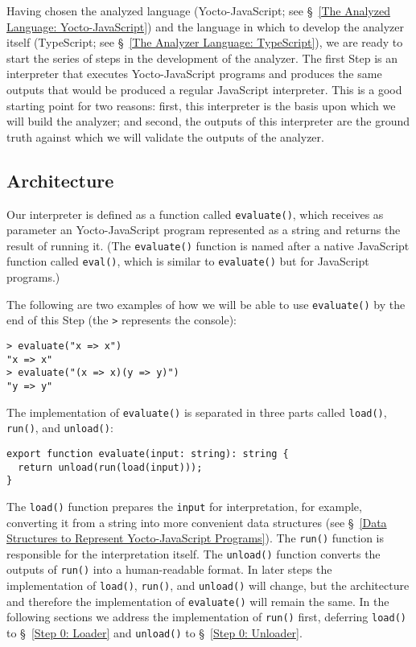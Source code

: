 \documentclass[12pt, oneside]{book}
\begin{document}
Having chosen the analyzed language (Yocto-JavaScript; see §~\ref{The Analyzed Language: Yocto-JavaScript}) and the language in which to develop the analyzer itself (TypeScript; see §~\ref{The Analyzer Language: TypeScript}), we are ready to start the series of steps in the development of the analyzer. The first Step is an interpreter that executes Yocto-JavaScript programs and produces the same outputs that would be produced a regular JavaScript interpreter. This is a good starting point for two reasons: first, this interpreter is the basis upon which we will build the analyzer; and second, the outputs of this interpreter are the ground truth against which we will validate the outputs of the analyzer.

\subsection{Architecture}
\label{Architecture}

Our interpreter is defined as a function called \texttt{evaluate()}, which receives as parameter an Yocto-JavaScript program represented as a string and returns the result of running it. (The \texttt{evaluate()} function is named after a native JavaScript function called \texttt{eval()}, which is similar to \texttt{evaluate()} but for JavaScript programs.)

The following are two examples of how we will be able to use \texttt{evaluate()} by the end of this Step (the \texttt{>} represents the console):

\begin{verbatim}
> evaluate("x => x")
"x => x"
> evaluate("(x => x)(y => y)")
"y => y"
\end{verbatim}

The implementation of \texttt{evaluate()} is separated in three parts called \texttt{load()}, \texttt{run()}, and \texttt{unload()}:

\begin{verbatim}
export function evaluate(input: string): string {
  return unload(run(load(input)));
}
\end{verbatim}

The \texttt{load()} function prepares the \texttt{input} for interpretation, for example, converting it from a string into more convenient data structures (see §~\ref{Data Structures to Represent Yocto-JavaScript Programs}). The \texttt{run()} function is responsible for the interpretation itself. The \texttt{unload()} function converts the outputs of \texttt{run()} into a human-readable format. In later steps the implementation of \texttt{load()}, \texttt{run()}, and \texttt{unload()} will change, but the architecture and therefore the implementation of \texttt{evaluate()} will remain the same. In the following sections we address the implementation of \texttt{run()} first, deferring \texttt{load()} to §~\ref{Step 0: Loader} and \texttt{unload()} to §~\ref{Step 0: Unloader}.
\end{document}
